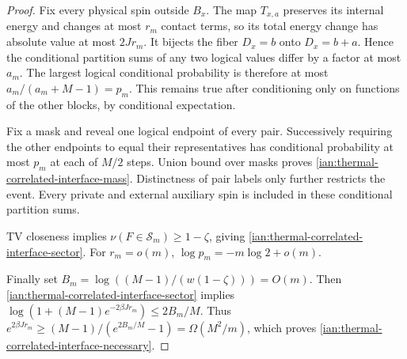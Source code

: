 \begin{proof}
Fix every physical spin outside \(B_x\). The map \(T_{x,a}\)
preserves its internal energy and changes at most \(r_m\) contact
terms, so its total energy change has absolute value at most
\(2Jr_m\).
It bijects the fiber \(D_x=b\) onto \(D_x=b+a\).
Hence the conditional partition sums of any two logical values
differ by a factor at most \(a_m\).
The largest logical conditional probability is therefore at most
\(a_m/(a_m+M-1)=p_m\).
This remains true after conditioning only on functions of the
other blocks, by conditional expectation.

Fix a mask and reveal one logical endpoint of every pair.
Successively requiring the other endpoints to equal their
representatives has conditional probability at most \(p_m\)
at each of \(M/2\) steps. Union bound over masks proves
\eqref{ian:thermal-correlated-interface-mass}.
Distinctness of pair labels only further restricts the event.
Every private and external auxiliary spin is included in these
conditional partition sums.

TV closeness implies
\(\nu(F\in\mathcal S_m)\ge1-\zeta\), giving
\eqref{ian:thermal-correlated-interface-sector}.
For \(r_m=o(m)\),
\(\log p_m=-m\log2+o(m)\).

Finally set
\(B_m=\log((M-1)/(w(1-\zeta)))=O(m)\).
Then \eqref{ian:thermal-correlated-interface-sector} implies
\(\log(1+(M-1)e^{-2\beta Jr_m})\le2B_m/M\).
Thus
\(e^{2\beta Jr_m}\ge(M-1)/(e^{2B_m/M}-1)
=\Omega(M^2/m)\), which proves
\eqref{ian:thermal-correlated-interface-necessary}.
\end{proof}

